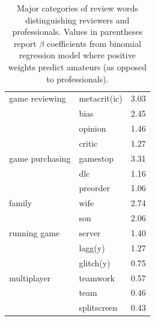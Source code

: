 \documentclass{sig-alternate}
\begin{document}
\begin{table}[tb!]
\begin{tabular}{llc}
\midrule 
game reviewing 
& metacrit(ic) & 3.03 \\ 
& bias & 2.45 \\ 
& opinion & 1.46 \\ 
& critic & 1.27 \\ [2ex]

\midrule 
game purchasing 
& gamestop & 3.31 \\ 
& dlc & 1.16 \\ 
& preorder & 1.06 \\ [2ex]

\midrule 
family 
& wife & 2.74 \\ 
& son & 2.06 \\ [2ex]

\midrule 
running game 
& server & 1.40 \\ 
& lagg(y) & 1.27 \\ 
& glitch(y) & 0.75 \\ [2ex]

\midrule 
multiplayer 
& teamwork & 0.57 \\ 
& team & 0.46 \\ 
& splitscreen & 0.43 \\

\end{tabular}
\caption{Major categories of review words distinguishing reviewers and professionals. Values in parentheses report $\beta$ coefficients from binomial regression model where positive weights predict amateurs (as opposed to professionals).}
\label{tab:user_classification_coef}
\end{table}
\end{document}
